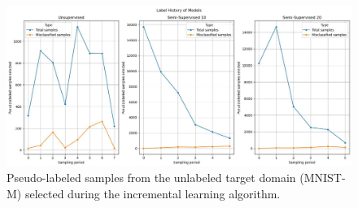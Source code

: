 \documentclass{article}
\begin{document}
	\begin{figure}
		\centering
		\includegraphics[width=12cm]{"mnist_misclassifications.jpeg"}
		\caption{Pseudo-labeled samples from the unlabeled target domain (MNIST-M) selected during the incremental learning algorithm.}
		\label{fig::mnist_misclassifications}
	\end{figure}
	
	
	\printbibliography
\end{document}
